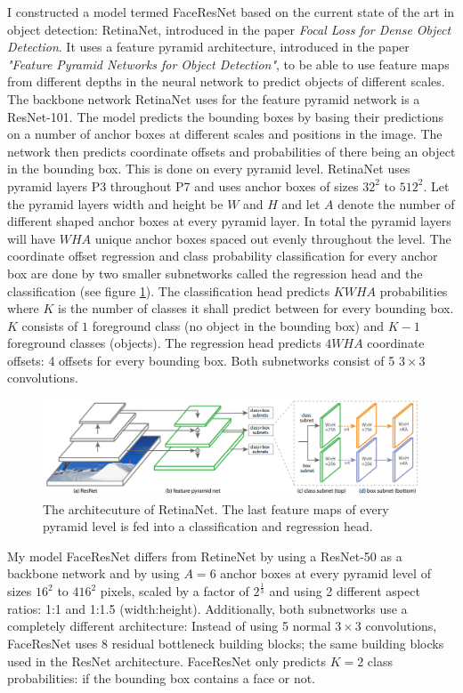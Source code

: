 \documentclass[a4paper, twoside]{article}
\begin{document}
I constructed a model termed FaceResNet based on the current state of the art in object detection: RetinaNet, introduced in the paper \textit{Focal Loss for Dense Object Detection}. It uses a feature pyramid architecture, introduced in the paper \textit{"Feature Pyramid Networks for Object Detection"}, to be able to use feature maps from different depths in the neural network to predict objects of different scales. The backbone network RetinaNet uses for the feature pyramid network is a ResNet-101. The model predicts the bounding boxes by basing their predictions on a number of anchor boxes at different scales and positions in the image. The network then predicts coordinate offsets and probabilities of there being an object in the bounding box. This is done on every pyramid level. RetinaNet uses pyramid layers P3 throughout P7 and uses anchor boxes of sizes $32^2$ to $512^2$. Let the pyramid layers width and height be $W$ and $H$ and let $A$ denote the number of different shaped anchor boxes at every pyramid layer. In total the pyramid layers will have $WHA$ unique anchor boxes spaced out evenly throughout the level. The coordinate offset regression and class probability classification for every anchor box are done by two smaller subnetworks called the regression head and the classification (see figure \ref{figretinanet}). The classification head predicts $KWHA$ probabilities where $K$ is the number of classes it shall predict between for every bounding box. $K$ consists of $1$ foreground class (no object in the bounding box) and $K-1$ foreground classes (objects). The regression head predicts $4WHA$ coordinate offsets: 4 offsets for every bounding box. Both subnetworks consist of 5 $3 \times 3$ convolutions. \cite{retinanet} \cite{fpn} \cite{resnet}

\begin{figure}[h]
	\centering
  		\includegraphics[scale=0.38]{retinanet.png}
  	\caption{The architecuture of RetinaNet. The last feature maps of every pyramid level is fed into a classification and regression head. \cite{retinanet}}\label{figretinanet}
\end{figure}

My model FaceResNet differs from RetineNet by using a ResNet-50 as a backbone network and by using $A=6$ anchor boxes at every pyramid level of sizes $16^2$ to $416^2$ pixels, scaled by a factor of $2^\frac{1}{3}$ and using 2 different aspect ratios: 1:1 and 1:1.5 (width:height). Additionally, both subnetworks use a completely different architecture: Instead of using 5 normal $3 \times 3$ convolutions, FaceResNet uses 8 residual bottleneck building blocks; the same building blocks used in the ResNet architecture. FaceResNet only predicts $K=2$ class probabilities: if the bounding box contains a face or not.
\end{document}
